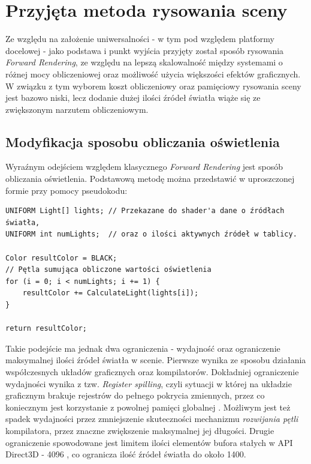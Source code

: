 \chapter{Przyjęta metoda rysowania sceny}
\label{ChapterSceneDrawingMethod}
	Ze względu na założenie uniwersalności - w tym pod względem platformy docelowej - jako podstawa i punkt wyjścia przyjęty został sposób rysowania \textit{Forward Rendering}, ze względu na lepszą skalowalność między systemami o różnej mocy obliczeniowej oraz możliwość użycia większości efektów graficznych. W związku z tym wyborem koszt obliczeniowy oraz pamięciowy rysowania sceny jest bazowo niski, lecz dodanie dużej ilości źródeł światła wiąże się ze zwiększonym narzutem obliczeniowym.
	
\section{Modyfikacja sposobu obliczania oświetlenia}
	Wyraźnym odejściem względem klasycznego \textit{Forward Rendering} jest sposób obliczania oświetlenia. Podstawową metodę można przedstawić w uproszczonej formie przy pomocy pseudokodu:
	
	\begin{lstlisting}[label={lst:shaderForwardLightCalculations}]
UNIFORM Light[] lights; // Przekazane do shader'a dane o źródłach światła,
UNIFORM int numLights;  // oraz o ilości aktywnych źródeł w tablicy.
		
Color resultColor = BLACK;
// Pętla sumująca obliczone wartości oświetlenia
for (i = 0; i < numLights; i += 1) {
    resultColor += CalculateLight(lights[i]);
}

return resultColor;
	\end{lstlisting}
	
	Takie podejście ma jednak dwa ograniczenia - wydajność oraz ograniczenie maksymalnej ilości źródeł światła w scenie.	Pierwsze wynika ze sposobu działania współczesnych układów graficznych oraz kompilatorów. Dokładniej ograniczenie wydajności wynika z tzw. \textit{Register spilling}, czyli sytuacji w której na układzie graficznym brakuje rejestrów do pełnego pokrycia zmiennych, przez co koniecznym jest korzystanie z powolnej pamięci globalnej \cite{amd:gpuopen:RegisterSpilling}. Możliwym jest też spadek wydajności przez zmniejszenie skuteczności mechanizmu \textit{rozwijania pętli} kompilatora, przez znaczne zwiększenie maksymalnej jej długości. Drugie ograniczenie spowodowane jest limitem ilości elementów bufora stałych w API Direct3D - 4096 \cite{microsoft:Direct3D11:ResourceLimits}, co ogranicza ilość źródeł światła do około 1400. 
	
